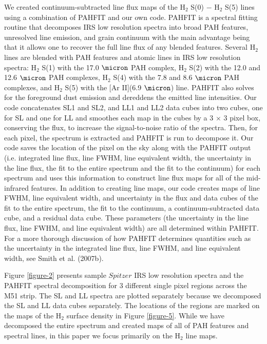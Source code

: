 \documentclass[12pt,preprint]{aastex}
\begin{document}
We created continuum-subtracted line flux maps of the H$_2$
S(0) $-$ H$_2$ S(5) lines using a combination of PAHFIT
\citep{smi07b} and our own code.  PAHFIT is a spectral fitting routine
that decomposes IRS low resolution spectra into broad 
PAH features, unresolved line emission, and grain continuum with the main advantage
being that it allows one to recover the full line flux of any blended
features.  Several H$_2$ lines are blended with PAH features and atomic 
lines in IRS low resolution spectra:
H$_2$ S(1) with the 17.0 $\micron$ PAH complex,
H$_2$ S(2) with the 12.0 and 12.6 $\micron$ PAH complexes, 
H$_2$ S(4) with the 7.8 and 8.6 $\micron$ PAH complexes, and 
H$_2$ S(5) with the [Ar II](6.9 $\micron$) line.  
PAHFIT also solves for the foreground dust emission and 
dereddens the emitted line intensities.  Our code
concatenates SL1 and SL2, and LL1 and LL2 data cubes into two cubes,
one for SL and one for LL and smoothes each map in the cubes by a 3
$\times$ 3 pixel box, conserving the flux, to increase the
signal-to-noise ratio of the spectra.  Then, for each pixel,
the spectrum is extracted and PAHFIT is run to decompose it.  Our code saves the
location of the pixel on the sky along with the PAHFIT output 
(i.e. integrated line flux, line FWHM, line equivalent width, the 
uncertainty in the line flux, the fit to the entire spectrum and 
the fit to the continuum) for each spectrum and uses this 
information to construct line flux maps for all of the mid-infrared 
features.  In addition to creating line maps, our code creates maps 
of line FWHM, line equivalent width, and uncertainty in the 
flux and data cubes of the fit to the entire spectrum, the fit to 
the continuum, a continuum-subtracted data cube, and a 
residual data cube.  These parameters (the uncertainty in 
the line flux, line FWHM, and line equivalent width) are all determined 
within PAHFIT.  For a more thorough discussion of how 
PAHFIT determines quantities such as the uncertainty 
in the integrated line flux, line FWHM, and line 
equivalent width, see Smith et al. (2007b). 

Figure \ref{figure-2} presents sample $Spitzer$ IRS low resolution 
spectra and the PAHFIT spectral decomposition for 3 different 
single pixel regions across the M51 strip.  The SL and LL spectra 
are plotted separately because we decomposed the SL and LL 
data cubes separately.  The locations of the regions are 
marked on the maps of the H$_2$ surface density in Figure \ref{figure-5}.  
While we have decomposed the entire spectrum and created maps of all of 
PAH features and spectral lines, in this paper we focus primarily 
on the H$_2$ line maps.
\end{document}
